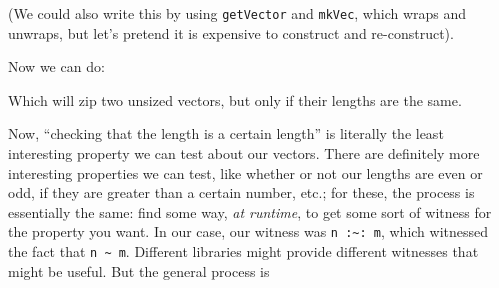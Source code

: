 \documentclass[]{article}
\newenvironment{Shaded}{}{}
\newcommand{\CommentTok}[1]{\textcolor[rgb]{0.38,0.63,0.69}{\textit{#1}}}
\newcommand{\DataTypeTok}[1]{\textcolor[rgb]{0.56,0.13,0.00}{#1}}
\newcommand{\KeywordTok}[1]{\textcolor[rgb]{0.00,0.44,0.13}{\textbf{#1}}}
\newcommand{\NormalTok}[1]{#1}
\newcommand{\OperatorTok}[1]{\textcolor[rgb]{0.40,0.40,0.40}{#1}}
\newcommand{\OtherTok}[1]{\textcolor[rgb]{0.00,0.44,0.13}{#1}}
\begin{document}
(We could also write this by using \texttt{getVector} and \texttt{mkVec}, which
wraps and unwraps, but let's pretend it is expensive to construct and
re-construct).

Now we can do:

\begin{Shaded}
\end{Shaded}

Which will zip two unsized vectors, but only if their lengths are the same.

Now, ``checking that the length is a certain length'' is literally the least
interesting property we can test about our vectors. There are definitely more
interesting properties we can test, like whether or not our lengths are even or
odd, if they are greater than a certain number, etc.; for these, the process is
essentially the same: find some way, \emph{at runtime}, to get some sort of
witness for the property you want. In our case, our witness was
\texttt{n\ :\textasciitilde{}:\ m}, which witnessed the fact that
\texttt{n\ \textasciitilde{}\ m}. Different libraries might provide different
witnesses that might be useful. But the general process is
\end{document}
